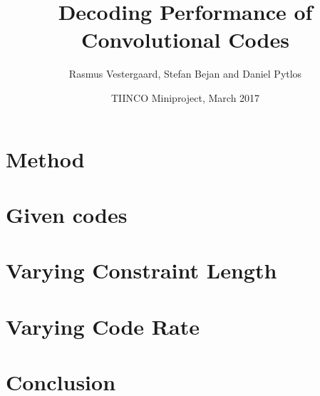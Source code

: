 \documentclass[11pt,a4paper]{article}
\title{Decoding Performance of Convolutional Codes}
\author{Rasmus Vestergaard, Stefan Bejan and Daniel Pytlos}
\date{TIINCO Miniproject, March 2017}
\begin{document}
		
\maketitle


\section{Method}
\label{sec:methodSection}


\section{Given codes\label{sec:givenCodesSection}}


\newpage
\section{Varying Constraint Length\label{sec:constantCodeRateSection}}

\section{Varying Code Rate\label{sec:constantContraintLengthSection}}

\section{Conclusion\label{sec:conclusionSection}}




\end{document}

